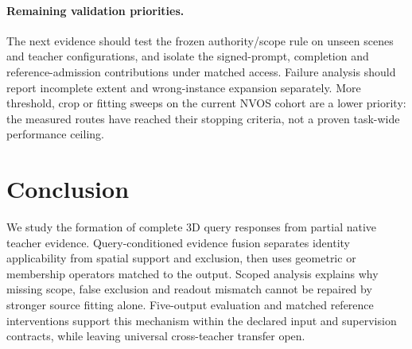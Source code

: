 \paragraph{Remaining validation priorities.}
The next evidence should test the frozen authority/scope rule on unseen scenes
and teacher configurations, and isolate the signed-prompt, completion and
reference-admission contributions under matched access. Failure analysis should
report incomplete extent and wrong-instance expansion separately. More
threshold, crop or fitting sweeps on the current NVOS cohort are a lower
priority: the measured routes have reached their stopping criteria, not a
proven task-wide performance ceiling.

\section{Conclusion}
We study the formation of complete 3D query responses from partial native
teacher evidence. Query-conditioned evidence fusion separates identity
applicability from spatial support and exclusion, then uses geometric or
membership operators matched to the output. Scoped analysis explains why
missing scope, false exclusion and readout mismatch cannot be repaired by
stronger source fitting alone. Five-output evaluation and matched reference
interventions support this mechanism within the declared input and supervision
contracts, while leaving universal cross-teacher transfer open.
